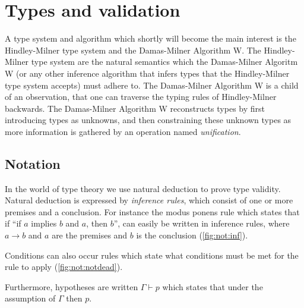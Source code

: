 \section{Types and validation}
\label{sec:types}
A type system and algorithm which shortly will become the main interest is the Hindley-Milner type system and the Damas-Milner Algorithm W.
The Hindley-Milner type system are the natural semantics which the Damas-Milner Algoritm W (or any other inference algorithm that infers types that the Hindley-Milner type system accepts) must adhere to.
The Damas-Milner Algorithm W is a child of an observation, that one can traverse the typing rules of Hindley-Milner backwards.
The Damas-Milner Algorithm W reconstructs types by first introducing types as unknowns, and then constraining these unknown types as more information is gathered by an operation named \textit{unification}.
\subsection{Notation}
In the world of type theory we use natural deduction to prove type validity.
Natural deduction is expressed by \textit{inference rules}, which consist of one or more premises and a conclusion.
For instance the modus ponens rule which states that if ``if $a$ implies $b$ and $a$, then $b$'', can easily be written in inference rules, where $a \rightarrow b$ and $a$ are the premises and $b$ is the conclusion (\autoref{fig:not:inf}).
\begin{figure}
  \begin{mdframed}
  \begin{prooftree}
  \end{prooftree}
  \end{mdframed}
  \caption{}
  \label{fig:not:inf}
\end{figure}
Conditions can also occur rules which state what conditions must be met for the rule to apply (\autoref{fig:not:notdead}).
\begin{figure}
  \begin{mdframed}
  \begin{prooftree}
  \end{prooftree}
  \end{mdframed}
  \caption{}
  \label{fig:not:notdead}
\end{figure}
Furthermore, hypotheses are written $\Gamma \vdash p$ which states that under the assumption of $\Gamma$ then $p$.

